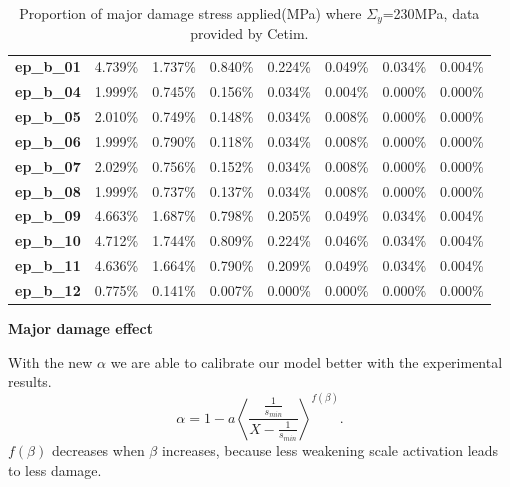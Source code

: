 \documentclass[3p,times,number,review]{elsarticle}
\begin{document}
\begin{table}[!h]
\begin{tabular}{llllllll}
		\textbf{ep\_b\_01}           & 4.739\%        & 1.737\%        & 0.840\%        & 0.224\%         & 0.049\%         & 0.034\%         & 0.004\%         \\
		\textbf{ep\_b\_04}           & 1.999\%        & 0.745\%        & 0.156\%        & 0.034\%         & 0.004\%         & 0.000\%         & 0.000\%         \\
		\textbf{ep\_b\_05}           & 2.010\%        & 0.749\%        & 0.148\%        & 0.034\%         & 0.008\%         & 0.000\%         & 0.000\%         \\
		\textbf{ep\_b\_06}           & 1.999\%        & 0.790\%        & 0.118\%        & 0.034\%         & 0.008\%         & 0.000\%         & 0.000\%         \\
		\textbf{ep\_b\_07}           & 2.029\%        & 0.756\%        & 0.152\%        & 0.034\%         & 0.008\%         & 0.000\%         & 0.000\%         \\
		\textbf{ep\_b\_08}           & 1.999\%        & 0.737\%        & 0.137\%        & 0.034\%         & 0.008\%         & 0.000\%         & 0.000\%         \\
		\textbf{ep\_b\_09}           & 4.663\%        & 1.687\%        & 0.798\%        & 0.205\%         & 0.049\%         & 0.034\%         & 0.004\%         \\
		\textbf{ep\_b\_10}           & 4.712\%        & 1.744\%        & 0.809\%        & 0.224\%         & 0.046\%         & 0.034\%         & 0.004\%         \\
		\textbf{ep\_b\_11}           & 4.636\%        & 1.664\%        & 0.790\%        & 0.209\%         & 0.049\%         & 0.034\%         & 0.004\%         \\
		\textbf{ep\_b\_12}           & 0.775\%        & 0.141\%        & 0.007\%        & 0.000\%         & 0.000\%         & 0.000\%         & 0.000\%         \\ \hline
	\end{tabular}
	\caption{Proportion of major damage stress applied(MPa) where $\Sigma_y$=230MPa, data provided by Cetim.}
	\label{tab.majordamage}
\end{table}

\clearpage
\textbf{Major damage effect}

With the new $\alpha$ we are able to calibrate our model better with the experimental results. 
$$\alpha=1-a\left\langle \dfrac{\frac{1}{s_{min}}}{X-\frac{1}{s_{min}}} \right\rangle^{f(\beta)}.$$
$f(\beta)$ decreases when $\beta$ increases, because less weakening scale activation leads to less damage. 
\end{document}
